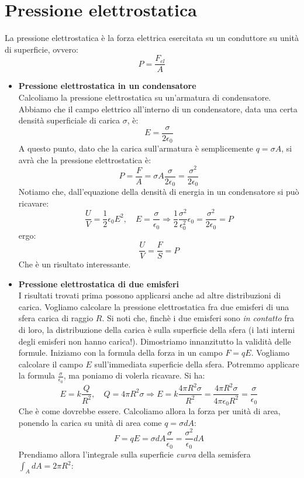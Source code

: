 \documentclass[a4paper,12pt]{article}
\begin{document}
\section{Pressione elettrostatica}
La pressione elettrostatica è la forza elettrica esercitata su un conduttore su unità di superficie, ovvero:
$$ P = \frac{F_{el}}{A} $$
\begin{itemize}
  \item \textbf{Pressione elettrostatica in un condensatore} \\
Calcoliamo la pressione elettrostatica su un'armatura di condensatore. Abbiamo che il campo elettrico all'interno di un condensatore, data una certa densità superficiale di carica $\sigma$, è:
$$ E = \frac{\sigma}{2\epsilon_0} $$
A questo punto, dato che la carica sull'armatura è semplicemente $q = \sigma A$, si avrà che la pressione elettrostatica è:
$$ P = \frac{F}{A} = \sigma A \frac{\sigma}{2\epsilon_0} = \frac{\sigma^2}{2\epsilon_0} $$
Notiamo che, dall'equazione della densità di energia in un condensatore si può ricavare:
$$ \frac{U}{V} = \frac{1}{2} \epsilon_0 E^2, \quad E = \frac{\sigma}{\epsilon_0} \Rightarrow \frac{1}{2} \frac{\sigma^2}{\epsilon_0^2}\epsilon_0 = \frac{\sigma^2}{2\epsilon_0} = P$$
ergo:
$$ \frac{U}{V} = \frac{F}{S} = P $$
Che è un risultato interessante.
  \item \textbf{Pressione elettrostatica di due emisferi} \\
    I risultati trovati prima possono applicarsi anche ad altre distribuzioni di carica. Vogliamo calcolare la pressione elettrostatica fra due emisferi di una sfera carica di raggio $R$. Si noti
    che, finchè i due emisferi sono \textit{in contatto} fra di loro, la distribuzione della carica è sulla superficie della sfera (i lati interni degli emisferi non hanno carica!).
    Dimostriamo innanzitutto la validità delle formule. Iniziamo con la formula della forza in un campo $F = qE$. Vogliamo calcolare il campo $E$
    sull'immediata superficie della sfera. Potremmo applicare la formula $\frac{\sigma}{\epsilon_0}$, ma poniamo di volerla ricavare. Si ha:
    $$ E = k \frac{Q}{R^2}, \quad Q = 4\pi R^2 \sigma \Rightarrow E = k \frac{4 \pi R^2 \sigma}{R^2} = \frac{4 \pi R^2 \sigma}{4 \pi \epsilon_0 R^2} = \frac{\sigma}{\epsilon_0} $$
    Che è come dovrebbe essere. Calcoliamo allora la forza per unità di area, ponendo la carica su unità di area come $q = \sigma dA$:
    $$ F = qE = \sigma dA \frac{\sigma}{\epsilon_0} = \frac{\sigma^2}{\epsilon_0} dA $$
    Prendiamo allora l'integrale sulla superficie \textit{curva} della semisfera $\int_A dA = 2\pi R^2$:

\end{itemize}
\end{document}
